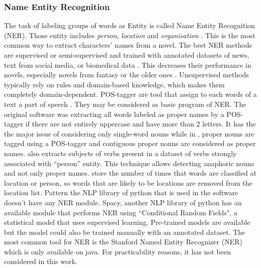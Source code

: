 \documentclass[a4paper, 12pt]{report}
\begin{document}
\subsubsection{Name Entity Recognition}
The task of labeling groups of words as Entity is called Name Entity Recognition (NER).
Those entity includes \textit{person}, \textit{location} and \textit{organisation} \citep{libraries}.
This is the most common way to extract characters' names from a novel.
The best NER methods are supervised or semi-supervised and trained with annotated datasets of news, text from social media, or biomedical data \citep{NER_survey_recent}.
This decreases their performance in novels, especially novels from fantasy or the older ones \citep{NER}.
Unsupervised methods typically rely on rules and domain-based knowledge, which makes them completely domain-dependent.
POS-tagger are tool that assign to each words of a text a part of speech \citep{POStag}. They may be considered as basic program of NER.
The original software \citep{original} was extracting all words labeled as proper names by a POS-tagger if there are not entirely uppercase and have more than 2 letters. It has the the major issue of considering only single-word nouns
while in \cite{quoted}, proper nouns are tagged using a POS-tagger and contiguous proper nouns are considered as proper names.
\cite{character_meta} also extracts subjects of verbs present in a dataset of verbs strongly associated with ``person'' entity.
This technique allows detecting anaphoric nouns and not only proper names. \cite{ structure_clustering} store the number of times that words are classified at location or person,
so words that are likely to be locations are removed from the location list.
Pattern the NLP library of python that is used in the software doesn't have any NER module.
Spacy, another NLP library of python has an available module that performs NER using ``Conditional Random Fields", a statistical model that uses supervised learning.
Pre-trained models are available but the model could also be trained manually with an annotated dataset.
The most common tool for NER is the Stanford Named Entity Recognizer (NER) which is only available on java. For practicability reasons, it has not been considered in this work.\\
\end{document}
